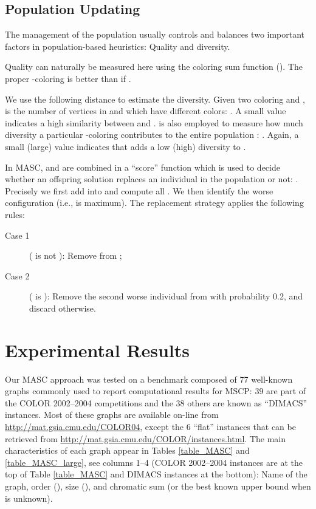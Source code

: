 \documentclass{elsart}
\begin{document}
\subsection{Population Updating}
\label{subsec_sol_population_update}

The management of the population usually controls and balances two important factors in population-based heuristics: Quality and diversity.

Quality can naturally be measured here using the coloring sum function (). The proper -coloring  is better than  if .

We use the following distance  to estimate the diversity. Given two coloring  and ,  is the number of vertices in  and  which have different colors: . A small  value indicates a high similarity between  and .  is also employed to measure how much diversity  a particular -coloring  contributes to the entire population : . Again, a small (large)  value indicates that  adds a low (high) diversity to .

In MASC,  and  are combined in a  ``score'' function which is used to decide whether an offspring solution  replaces an individual in the population  or not: . Precisely we first add  into  and compute all . We then identify the worse configuration  (i.e.,  is maximum). The replacement strategy applies the following rules:

\begin{description}
\item[Case 1] ( is not ): Remove  from ;
\item[Case 2] ( is ): Remove the second worse individual from  with probability 0.2, and discard  otherwise.
\end{description}

\section{Experimental Results}
\label{Sec_Results}

Our MASC approach was tested on a benchmark composed of 77 well-known graphs commonly used to report computational results for MSCP: 39 are part of the COLOR 2002--2004 competitions and the 38 others are known as ``DIMACS'' instances. Most of these graphs are available on-line from \url{http://mat.gsia.cmu.edu/COLOR04}, except the 6 ``flat'' instances that can be retrieved from \url{http://mat.gsia.cmu.edu/COLOR/instances.html}. The main characteristics of each graph appear in Tables \ref{table_MASC} and \ref{table_MASC_large}, see columns 1--4 (COLOR 2002--2004 instances are at the top of Table \ref{table_MASC} and DIMACS instances at the bottom): Name of the graph, order (), size (), and chromatic sum  (or the best known upper bound when  is unknown).
\end{document}
